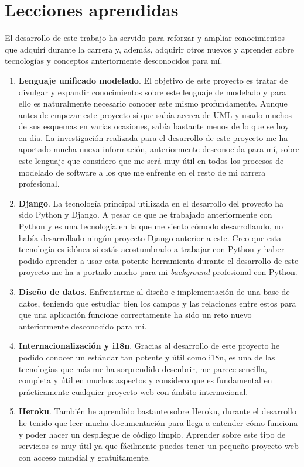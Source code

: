 \documentclass[a4paper, 12pt]{book}
\begin{document}
\section{Lecciones aprendidas}
\label{sec:lecciones_aprendidas}
El desarrollo de este trabajo ha servido para reforzar y ampliar conocimientos que adquirí durante la carrera y, además, adquirir otros nuevos y aprender sobre tecnologías y conceptos anteriormente desconocidos para mí. 

\begin{enumerate} 
  \item \textbf{Lenguaje unificado modelado}. El objetivo de este proyecto es tratar de divulgar y expandir conocimientos sobre este lenguaje de modelado y para ello es naturalmente necesario conocer este mismo profundamente. Aunque antes de empezar este proyecto sí que sabía acerca de UML y usado muchos de sus esquemas en varias ocasiones, sabía bastante menos de lo que se hoy en día. La investigación realizada para el desarrollo de este proyecto me ha aportado mucha nueva información, anteriormente desconocida para mí, sobre este lenguaje que considero que me será muy útil en todos los procesos de modelado de software a los que me enfrente en el resto de mi carrera profesional. 
  \item \textbf{Django}. La tecnología principal utilizada en el desarrollo del proyecto ha sido Python y Django. A pesar de que he trabajado anteriormente con Python y es una tecnología en la que me siento cómodo desarrollando, no había desarrollado ningún proyecto Django anterior a este. Creo que esta tecnología es idónea si estás acostumbrado a trabajar con Python y haber podido aprender a usar esta potente herramienta durante el desarrollo de este proyecto me ha a portado mucho para mi \emph{background} profesional con Python. 
  \item \textbf{Diseño de datos}. Enfrentarme al diseño e implementación de una base de datos, teniendo que estudiar bien los campos y las relaciones entre estos para que una aplicación funcione correctamente ha sido un reto nuevo anteriormente desconocido para mí. 
  \item \textbf{Internacionalización y i18n}. Gracias al desarrollo de este proyecto he podido conocer un estándar tan potente y útil como i18n, es una de las tecnologías que más me ha sorprendido descubrir, me parece sencilla, completa y útil en muchos aspectos y considero que es fundamental en prácticamente cualquier proyecto web con ámbito internacional. 
  \item \textbf{Heroku}. También he aprendido bastante sobre Heroku, durante el desarrollo he tenido que leer mucha documentación para llega a entender cómo funciona y poder hacer un despliegue de código limpio. Aprender sobre este tipo de servicios es muy útil ya que fácilmente puedes tener un pequeño proyecto web con acceso mundial y gratuitamente. 
\end{enumerate}
\end{document}
